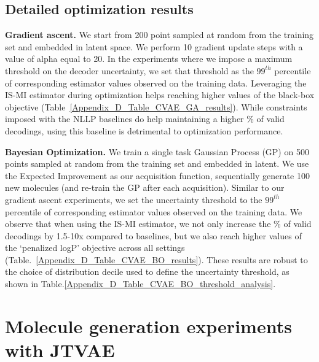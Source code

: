 \subsection{Detailed optimization results}
\label{Appendix_D.4_Molecule_CVAE_Optimization}
\textbf{Gradient ascent.} We start from 200 point sampled at random from the training set and embedded in latent space. We perform 10 gradient update steps with a value of alpha equal to 20. In the experiments where we impose a maximum threshold on the decoder uncertainty, we set that threshold as the $99^{th}$ percentile of corresponding estimator values observed on the training data. Leveraging the IS-MI estimator during optimization helps reaching higher values of the black-box objective (Table~\ref{Appendix_D_Table_CVAE_GA_results}). While constraints imposed with the NLLP baselines do help maintaining a higher \% of valid decodings, using this baseline is detrimental to optimization performance.



\textbf{Bayesian Optimization.} We train a single task Gaussian Process (GP) on 500 points sampled at random from the training set and embedded in latent. We use the Expected Improvement as our acquisition function, sequentially generate 100 new molecules (and re-train the GP after each acquisition). Similar to our gradient ascent experiments, we set the uncertainty threshold to the $99^{th}$ percentile of corresponding estimator values observed on the training data. We observe that when using the IS-MI estimator, we not only increase the \% of valid decodings by 1.5-10x compared to baselines, but we also reach higher values of the `penalized logP' objective across all settings (Table.~\ref{Appendix_D_Table_CVAE_BO_results}). These results are robust to the choice of distribution decile used to define the uncertainty threshold, as shown in Table.\ref{Appendix_D_Table_CVAE_BO_threshold_analysis}.




\vspace{-3mm}

\section{Molecule generation experiments with JTVAE}
\label{Appendix_E_Molecule_JTVAE}


